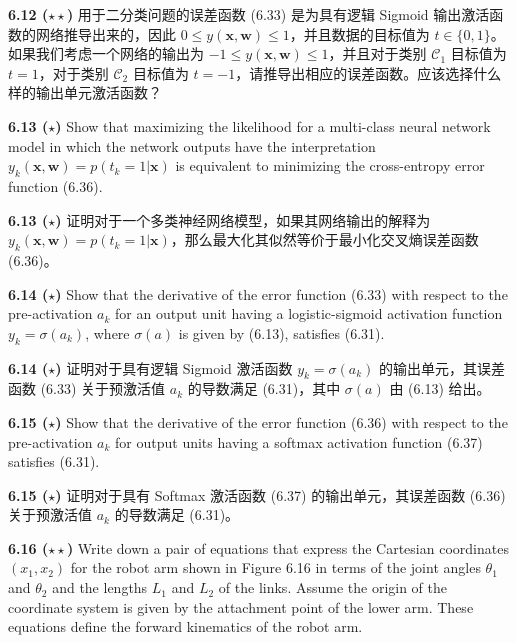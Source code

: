 \documentclass{article}
\begin{document}
\textbf{6.12 ($\star\star$)} 用于二分类问题的误差函数 (6.33) 是为具有逻辑 Sigmoid 输出激活函数的网络推导出来的，因此 $0 \le y(\mathbf{x}, \mathbf{w}) \le 1$，并且数据的目标值为 $t \in \{0, 1\}$。如果我们考虑一个网络的输出为 $-1 \le y(\mathbf{x}, \mathbf{w}) \le 1$，并且对于类别 $\mathcal{C}_1$ 目标值为 $t=1$，对于类别 $\mathcal{C}_2$ 目标值为 $t=-1$，请推导出相应的误差函数。应该选择什么样的输出单元激活函数？

\vspace{1em}

\textbf{6.13 ($\star$)} Show that maximizing the likelihood for a multi-class neural network model in which the network outputs have the interpretation $y_k(\mathbf{x}, \mathbf{w}) = p(t_k=1|\mathbf{x})$ is equivalent to minimizing the cross-entropy error function (6.36).

\textbf{6.13 ($\star$)} 证明对于一个多类神经网络模型，如果其网络输出的解释为 $y_k(\mathbf{x}, \mathbf{w}) = p(t_k=1|\mathbf{x})$，那么最大化其似然等价于最小化交叉熵误差函数 (6.36)。

\vspace{1em}

\textbf{6.14 ($\star$)} Show that the derivative of the error function (6.33) with respect to the pre-activation $a_k$ for an output unit having a logistic-sigmoid activation function $y_k = \sigma(a_k)$, where $\sigma(a)$ is given by (6.13), satisfies (6.31).

\textbf{6.14 ($\star$)} 证明对于具有逻辑 Sigmoid 激活函数 $y_k = \sigma(a_k)$ 的输出单元，其误差函数 (6.33) 关于预激活值 $a_k$ 的导数满足 (6.31)，其中 $\sigma(a)$ 由 (6.13) 给出。

\vspace{1em}

\textbf{6.15 ($\star$)} Show that the derivative of the error function (6.36) with respect to the pre-activation $a_k$ for output units having a softmax activation function (6.37) satisfies (6.31).

\textbf{6.15 ($\star$)} 证明对于具有 Softmax 激活函数 (6.37) 的输出单元，其误差函数 (6.36) 关于预激活值 $a_k$ 的导数满足 (6.31)。

\vspace{1em}

\textbf{6.16 ($\star\star$)} Write down a pair of equations that express the Cartesian coordinates $(x_1, x_2)$ for the robot arm shown in Figure 6.16 in terms of the joint angles $\theta_1$ and $\theta_2$ and the lengths $L_1$ and $L_2$ of the links. Assume the origin of the coordinate system is given by the attachment point of the lower arm. These equations define the forward kinematics of the robot arm.
\end{document}
